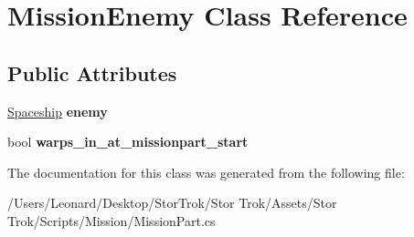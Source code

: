 \hypertarget{class_mission_enemy}{}\section{Mission\+Enemy Class Reference}
\label{class_mission_enemy}
\subsection*{Public Attributes}
\begin{DoxyCompactItemize}
\item 
\mbox{\label{class_mission_enemy_a00c8cfc36791fc0c7408fa3075780f95}} 
\hyperlink{class_spaceship}{Spaceship} {\bfseries enemy}
\item 
\mbox{\label{class_mission_enemy_ab8c8ef90135f0490d8ffc1b33b721a29}} 
bool {\bfseries warps\+\_\+in\+\_\+at\+\_\+missionpart\+\_\+start}
\end{DoxyCompactItemize}


The documentation for this class was generated from the following file\+:\begin{DoxyCompactItemize}
\item 
/\+Users/\+Leonard/\+Desktop/\+Stor\+Trok/\+Stor Trok/\+Assets/\+Stor Trok/\+Scripts/\+Mission/Mission\+Part.\+cs\end{DoxyCompactItemize}
